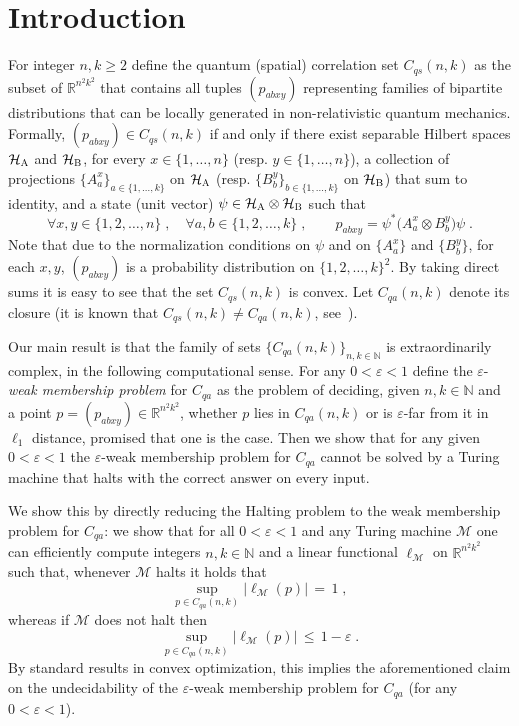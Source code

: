\documentclass[11pt]{article}
\theoremstyle{definition}
\newcommand{\N}{\ensuremath{\mathbb{N}}}
\newcommand{\R}{\ensuremath{\mathbb{R}}}
\newcommand{\mH}{\ensuremath{\mathcal{H}}}
\newcommand{\cM}{\ensuremath{\mathcal{M}}}
\newcommand{\eps}{\varepsilon}
\newcommand{\labelstyle}[1]{\ensuremath{\textsc{#1}}\xspace}
\newcommand{\alice}{\labelstyle{A}}
\newcommand{\bob}{\labelstyle{B}}
\begin{document}
\newpage

\tableofcontents

\section{Introduction}
\label{sec:intro}

For integer $n,k\geq 2$ define the quantum (spatial) correlation set $C_{qs}(n,k)$ as the subset of $\R^{n^2k^2}$ that contains all tuples $(p_{abxy})$ representing families of bipartite distributions that can be locally generated in non-relativistic quantum mechanics. Formally, $(p_{abxy}) \in C_{qs}(n,k)$ if and only if there exist separable Hilbert spaces $\mH_\alice$ and $\mH_\bob$, for every $x\in\{1,\ldots,n\}$ (resp. $y\in\{1,\ldots,n\}$), a collection of projections $\{A^x_a\}_{a\in\{1,\ldots,k\}}$ on $\mH_\alice$ (resp. $\{B^y_b\}_{b\in\{1,\ldots,k\}}$ on $\mH_\bob$) that sum to identity, and a state (unit vector) $\psi \in \mH_\alice \otimes \mH_\bob$ such that 
\begin{equation}\label{eq:intro-qs}
  \forall x,y\in \{1, 2, \ldots, n\}\;,\quad\forall a,b\in\{1, 2, \ldots, k\}\;,
  \qquad p_{abxy} = \psi^* \big( A^x_a \otimes B^y_b\big) \psi\;.
\end{equation}
Note that due to the normalization conditions on $\psi$ and on $\{A^x_a\}$ and
$\{B^y_b\}$, for each $x,y$, $(p_{abxy})$ is a probability distribution on
$\{1, 2, \ldots, k\}^2$.
By taking direct sums it is easy to see that the set $C_{qs}(n,k)$ is convex. Let $C_{qa}(n,k)$ denote its closure (it is known that $C_{qs}(n,k) \neq C_{qa}(n,k)$, see~\cite{slofstra2019set}).


Our main result is that the family of sets $\{C_{qa}(n,k)\}_{n,k \in \N}$ is extraordinarily complex, in the following computational sense. For any $0<\eps<1$ define the $\eps$-\emph{weak membership problem} for $C_{qa}$ as the problem of deciding, given $n,k \in \N$ and a point $p=(p_{abxy}) \in \R^{n^2 k^2}$, whether $p$ lies in $C_{qa}(n,k)$ or is $\eps$-far from it in $\ell_1$ distance, promised that one is the case. Then we show that for any given $0<\eps<1$ the  $\eps$-{weak membership problem} for $C_{qa}$ cannot be solved by a Turing machine that halts with the correct answer on every input.

We show this by directly reducing the Halting problem to the weak membership problem for $C_{qa}$: we show that for all $0 < \eps < 1$ and any Turing machine $\cM$ one can efficiently compute integers $n,k\in \N$ and a linear functional $\ell_\cM$ on $\R^{n^2k^2}$ such that, whenever $\cM$ halts it holds that 
\begin{equation}\label{eq:intro-win-1}
\sup_{p\in C_{qa}(n,k)} \big|\ell_\cM(p)\big| \,=\,1\;,
\end{equation}
 whereas if $\cM$ does not halt then 
\begin{equation}\label{eq:intro-win-2}
\sup_{p\in C_{qa}(n,k)} \big|\ell_\cM(p)\big| \,\leq\, 1 - \eps\;.
\end{equation}
By standard results in convex optimization, this implies the aforementioned claim on the undecidability of the $\eps$-weak membership problem for $C_{qa}$ (for any $0<\eps<1$). 
\end{document}
